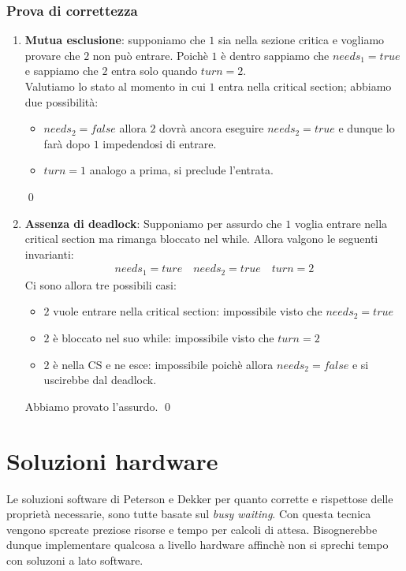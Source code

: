 \documentclass{article}
\begin{document}
\subsubsection{Prova di correttezza}

\begin{enumerate}
  \item \textbf{Mutua esclusione}: supponiamo che $1$ sia nella sezione critica
    e vogliamo provare che $2$ non pu\`o entrare. Poich\`e $1$ \`e dentro sappiamo
    che $needs_1 = true$ e sappiamo che $2$ entra solo quando $turn = 2$. \\
    Valutiamo lo stato al momento in cui $1$ entra nella critical section;
    abbiamo due possibilit\`a:
    \begin{itemize}
      \item $needs_2 = false$ allora $2$ dovr\`a ancora eseguire $needs_2 = true$
        e dunque lo far\`a dopo $1$ impedendosi di entrare.
      \item $turn = 1$ analogo a prima, si preclude l'entrata.
    \end{itemize}
    \qed
  \item \textbf{Assenza di deadlock}: Supponiamo per assurdo che $1$ voglia
    entrare nella critical section ma rimanga bloccato nel while. Allora
    valgono le seguenti invarianti:
    \begin{align*}
      needs_1 = ture \quad needs_2 = true \quad turn = 2
    \end{align*}
    Ci sono allora tre possibili casi:
    \begin{itemize}
      \item $2$ vuole entrare nella critical section: impossibile visto che $needs_2 = true$
      \item $2$ \`e bloccato nel suo while: impossibile visto che $turn = 2$
      \item $2$ \`e nella CS e ne esce: impossibile poich\`e allora $needs_2 = false$
        e si uscirebbe dal deadlock.
    \end{itemize}
    Abbiamo provato l'assurdo. \qed
\end{enumerate}

\section{Soluzioni hardware}

Le soluzioni software di Peterson e Dekker per quanto corrette e rispettose delle
propriet\`a necessarie, sono tutte basate sul \emph{busy waiting}. Con questa
tecnica vengono spcreate preziose risorse e tempo per calcoli di attesa.
Bisognerebbe dunque implementare qualcosa a livello hardware affinch\`e non si
sprechi tempo con soluzoni a lato software.
\end{document}
